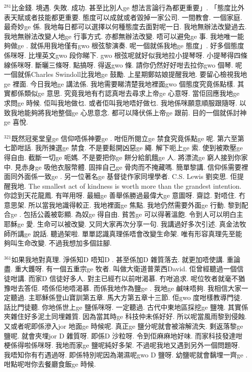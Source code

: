 \documentclass{book}
\begin{document}
$^{281}$比金錢.
境遇.
失敗.
成功.
甚至比別人ge 想法言論行為都更重要」.
「態度比外表天賦或者技能都更重要.
態度可以成就或者毀掉一家公司.
一間教會.
一個家庭.
最奇妙ge 係.
我地每日都可以選擇以何種態度去面對呢一日.
我地無辦法改變過去.
我地無辦法改變人地ge 行事方式.
亦都無辦法改變.
唔可以避免ge 事.
我地唯一能夠做ge .
就係用我地僅有gwo 根弦黎演奏.
呢一個就係我地ge 態度」.
好多個態度係咪呀.
比埋英文gwo 段你睇下.
gwo 根弦呢就好似我地拉小提琴呀.
小提琴得四條線係咪呀.
斷曬三條呀.
點搞呀.
得返gwo 條.
請你仍然好好咁去拉你gwo 個琴.
呢一個就係Charles Swindoll比我地ge 鼓勵.
上星期鄭姑娘提醒我地.
要留心檢視我地ge 裡面.
今日我地ge 講法係.
我地需要睇清楚我地裡面gwo 個態度究竟係點樣.
其實都係類似ge 意思.
究竟我地有冇認真咁去尋求上帝ge 心意呀.
當佢回應我地ge 求問ge 時候.
佢叫我地做乜.
或者佢叫我地唔好做乜.
我地係咪願意順服跟隨呀.
以致我地能夠將我地整個ge 心思意念.
都可以降伏係上帝ge 跟前.
目的一個就係討神ge 喜悅.

$^{321}$既然冠冕堂皇ge 信仰唔係神要ge .
咁佢所閱立ge 禁食究竟係點ge 呢.
第六至第七節咁話.
我所揀選ge 禁食.
不是要鬆開凶惡ge 繩.
解下呃上ge 索.
使到被欺壓ge 得自由.
截斷一切ge 呃媽.
不是要把你ge 餅分給飢餓ge 人.
將漂流ge 窮人接到你家中.
見赤身ge 吸他衣服幣體.
固摔自己ge 骨肉而不掩藏嗎.
簡單黎講.
信仰係需要裡面同外面係一致ge .
另一位著名ge 基督徒作家同埋學者.
C.S. Lewis 劉奕思.
佢提醒我地.
The smallest act of kindness is worth more than the grandest intention.
你諗到天花龍鳳.
有咩用呀.
最細ge 善舉係勝過最偉大ge 意圖呀.
齋諗.
對唔住.
冇意思架.
所以當我地識得較正.
我地裡面ge 焦點.
我地仍然需要外面ge 行動.
黎到配合ge .
包括公義被彰顯.
為奴ge 得自由.
貧苦ge 可以得著溫飽.
令到人可以明白主耶穌ge 愛.
生命可以被改變.
又同大家再次分享一句.
我講過好多次引述.
真金法牧師所講ge 說話.
聽過架啦.
單單認識真理係唔會改變生命架.
唯有形容真理先至能夠叫生命改變.
不過我想加多個註腳.

$^{361}$如果我地對真理.
淨係知D 唔知D .
甚至係加D 雜質落去.
就更加唔使講.
重論盡.
重大鑊呀.
有一個五重宗ge 牧者.
叫做大衛道普萊西David.
佢曾經聽過一個信徒咁講.
而家D 信徒好多人.
對主已經冇以前咁渴慕.
冇咁追求.
呢位牧者就毫不猶豫咁去答佢.
唔係佢地唔渴慕.
而係我地作為鹽ge .
我地ge 鹹味唔夠.
我相信大家一定聽過.
主耶穌係登山寶訓第五章.
馬大方第五章十三節.
佢gwo 度咁樣教導門徒.
話比門徒聽.
你地係世上ge 鹽係咪呀.
一定聽過.
古代中東地區採挖ge 鹽塊.
其實係夾雜住好多泥土同埋雜質.
因為當其時ge 科技仲未係好好.
所以呢當風雨黎到侵蝕.
又或者呢即係滲入jor 地面ge 時候呢.
真正ge 鹽分呢就會被溶解流失.
剩返落黎ge 鹽呢.
就會夾埋jor D 雜質呀.
即係D 沙粒呀.
令到佢麻麻地好味.
而家科技發達咁梗係得啦係咪呀.
我地而家ge 鹽呢純好多架.
不過呢我地又遇到另外一個問題呀.
我唔知你有冇遇過呀.
即係特別呢因為潮濕呢gwo D 鹽呀.
幼鹽呢就會黐埋一齊ge .
咁點呢咁你去餐廳食飯ge 時候.
\end{document}
